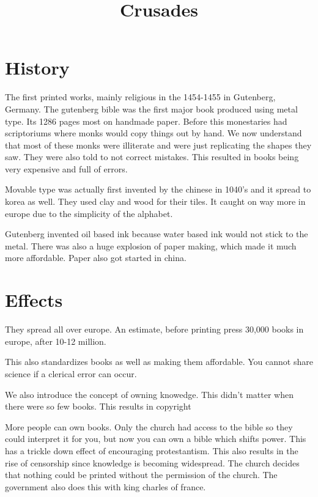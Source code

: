 \documentclass{article}
\begin{document}
\title{Crusades}
\maketitle

\section*{History}
\label{sec:history}

The first printed works, mainly religious in the 1454-1455 in Gutenberg, Germany. The gutenberg bible was the first major book produced using metal type. Its 1286 pages most on handmade paper. Before this monestaries had scriptoriums where monks would copy things out by hand. We now understand that most of these monks were illiterate and were just replicating the shapes they saw. They were also told to not correct mistakes. This resulted in books being very expensive and full of errors.

Movable type was actually first invented by the chinese in 1040's and it spread to korea as well. They used clay and wood for their tiles. It caught on way more in europe due to the simplicity of the alphabet.

Gutenberg invented oil based ink because water based ink would not stick to the metal. There was also a huge explosion of paper making, which made it much more affordable. Paper also got started in china.

\section*{Effects}
\label{sec:effects}

They spread all over europe. An estimate, before printing press 30,000 books in europe, after 10-12 million.

This also standardizes books as well as making them affordable. You cannot share science if a clerical error can occur.

We also introduce the concept of owning knowedge. This didn't matter when there were so few books. This results in copyright

More people can own books. Only the church had access to the bible so they could interpret it for you, but now you can own a bible which shifts power. This has a trickle down effect of encouraging protestantism. This also results in the rise of censorship since knowledge is becoming widespread. The church decides that nothing could be printed without the permission of the church. The government also does this with king charles of france.
\end{document}
